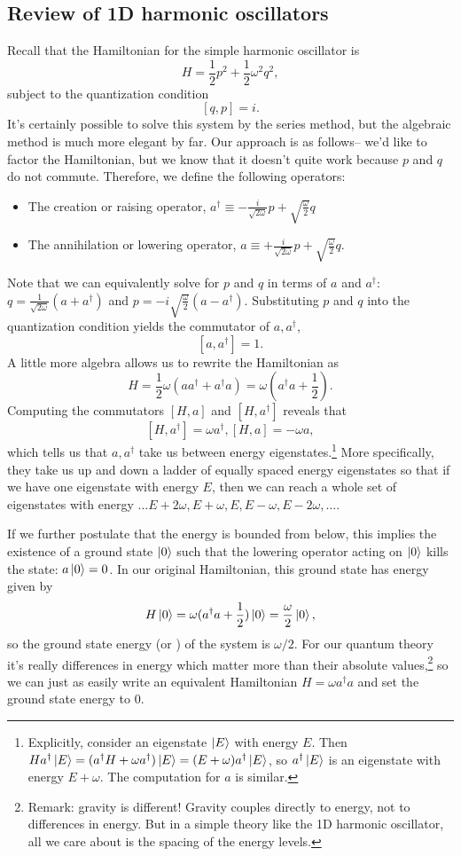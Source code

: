 \subsection*{Review of 1D harmonic oscillators} Recall that the Hamiltonian for the simple harmonic oscillator is
$$H=\frac{1}{2} p^2 +\frac{1}{2} \omega^2 q^2,$$
subject to the quantization condition $$[q,p]=i.$$ It's certainly possible to solve this system by the series method, but the algebraic method is much more elegant by far. Our approach is as follows-- we'd like to factor the Hamiltonian, but we know that it doesn't quite work because $p$ and $q$ do not commute. Therefore, we define the following operators:
\begin{itemize}
\item The creation or raising operator, $a^\dagger \equiv -\frac{i}{\sqrt{2\omega}} p +\sqrt{\frac{\omega}{2}}q$
\item The annihilation or lowering operator, $a \equiv +\frac{i}{\sqrt{2\omega}} p +\sqrt{\frac{\omega}{2}}q$.
\end{itemize}
Note that we can equivalently solve for $p$ and $q$ in terms of $a$ and $a^\dagger$: $q=\frac{1}{\sqrt{2\omega}}(a+a^\dagger)$ and $p=-i \sqrt{\frac{\omega}{2}}(a-a^\dagger)$. Substituting $p$ and $q$ into the quantization condition yields the commutator of $a,a^\dagger$,
$$[a,a^\dagger]=1.$$
A little more algebra allows us to rewrite the Hamiltonian as
$$H=\frac{1}{2}\omega (a a^\dagger+ a^\dagger a)=\omega (a^\dagger a +\frac{1}{2}).$$
Computing the commutators $[H,a]$ and $[H,a^\dagger]$ reveals that
$$[H,a^\dagger]=\omega a^\dagger, [H,a]=-\omega a,$$
which tells us that $a,a^\dagger$ take us between energy eigenstates.\footnote{Explicitly, consider an eigenstate $\left| E \right>$ with energy $E$. Then $H a^\dagger \left| E \right>=(a^\dagger H +\omega a^\dagger)\left| E \right> =(E+\omega)a^\dagger \left| E \right>$, so $a^\dagger \left| E \right>$ is an eigenstate with energy $E+\omega.$ The computation for $a$ is similar.} More specifically, they take us up and down a ladder of equally spaced energy eigenstates so that if we have one eigenstate with energy $E$, then we can reach a whole set of eigenstates with energy $\ldots E+2\omega, E+\omega, E, E-\omega, E-2\omega, \ldots$.

If we further postulate that the energy is bounded from below, this implies the existence of a ground state $\left| 0 \right>$ such that the lowering operator acting on $\left| 0 \right>$ kills the state: $a\left| 0 \right>= 0$. In our original Hamiltonian, this ground state has energy given by
$$H \left| 0 \right>=\omega (a^\dagger a +\frac{1}{2})\left| 0 \right> = \frac{\omega}{2}\left| 0 \right>,$$ so the ground state energy (or ) of the system is $\omega/2$. For our quantum theory it's really differences in energy which matter more than their absolute values,\footnote{Remark: gravity is different! Gravity couples directly to energy, not to differences in energy. But in a simple theory like the 1D harmonic oscillator, all we care about is the spacing of the energy levels.} so we can just as easily write an equivalent Hamiltonian $H=\omega a^\dagger a$ and set the ground state energy to $0$.

